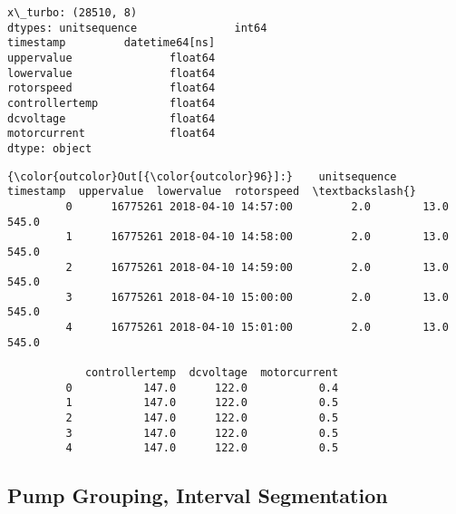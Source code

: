 \documentclass[11pt]{article}
\begin{document}
    \begin{Verbatim}[commandchars=\\\{\}]
x\_turbo: (28510, 8)
dtypes: unitsequence               int64
timestamp         datetime64[ns]
uppervalue               float64
lowervalue               float64
rotorspeed               float64
controllertemp           float64
dcvoltage                float64
motorcurrent             float64
dtype: object

    \end{Verbatim}

\begin{Verbatim}[commandchars=\\\{\}]
{\color{outcolor}Out[{\color{outcolor}96}]:}    unitsequence           timestamp  uppervalue  lowervalue  rotorspeed  \textbackslash{}
         0      16775261 2018-04-10 14:57:00         2.0        13.0       545.0   
         1      16775261 2018-04-10 14:58:00         2.0        13.0       545.0   
         2      16775261 2018-04-10 14:59:00         2.0        13.0       545.0   
         3      16775261 2018-04-10 15:00:00         2.0        13.0       545.0   
         4      16775261 2018-04-10 15:01:00         2.0        13.0       545.0   
         
            controllertemp  dcvoltage  motorcurrent  
         0           147.0      122.0           0.4  
         1           147.0      122.0           0.5  
         2           147.0      122.0           0.5  
         3           147.0      122.0           0.5  
         4           147.0      122.0           0.5  
\end{Verbatim}
            
    \subsection{Pump Grouping, Interval
Segmentation}\label{pump-grouping-interval-segmentation}
\end{document}
